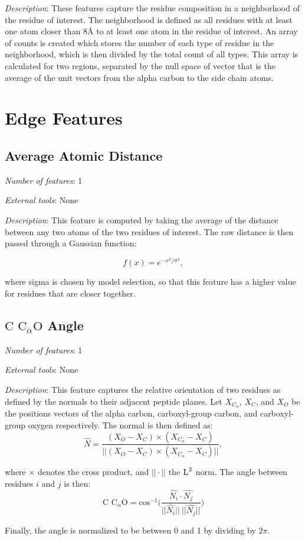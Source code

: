 \noindent
\emph{Description}:
These features capture the residue composition in a neighborhood of the residue of interest.
The neighborhood is defined as all residues with at least one atom closer than 8\AA{} to at least one atom in the residue of interest.
An array of counts is created which stores the number of each type of residue in the neighborhood, which is then divided by the total count of all types.
This array is calculated for two regions, separated by the null space of vector that is the average of the unit vectors from the alpha carbon to the side chain atoms.


\section{Edge Features}

\subsection{Average Atomic Distance}
\noindent
\emph{Number of features}: 1

\noindent
\emph{External tools}: None

\noindent
\emph{Description}:
This feature is computed by taking the average of the distance between any two atoms of the two residues of interest.
The raw distance is then passed through a Gaussian function: 

\begin{equation}
f(x) = e^{-x^2 / \sigma^2},
\end{equation}

\noindent
where sigma is chosen by model selection, so that this feature has a higher value for residues that are closer together.


\subsection{$\text{C C}_{\alpha} \text{O}$ Angle}
\noindent
\emph{Number of features}: 1

\noindent
\emph{External tools}: None

\noindent
\emph{Description}:
This feature captures the relative orientation of two residues as defined by the normals to their adjacent peptide planes.
Let $X_{C_{\alpha}}$, $X_{C}$, and $X_{O}$ be the positions vectors of the alpha carbon, carboxyl-group carbon, and carboxyl-group oxygen respectively.
The normal is then defined as:
\begin{equation}
\hat{N} = \frac{(X_{O} - X_{C}) \times  (X_{C_\alpha} - X_{C})}{||(X_{O} - X_{C}) \times  (X_{C_\alpha} - X_{C})||}, 
\end{equation}

\noindent
where $\times$ denotes the cross product, and $ || \cdot || $ the $\textsc{L}^2$ norm.
The angle between residues $i$ and $j$ is then:
\begin{equation}
\text{C C}_{\alpha} \text{O} = \text{cos}^{-1}\bigg(\frac{\hat{N_i} \cdot \hat{N_j}}{|| \hat{N_i} ||~|| \hat{N_j} || } \bigg)
\end{equation}

\noindent
Finally, the angle is normalized to be between 0 and 1 by dividing by $2 \pi$. 